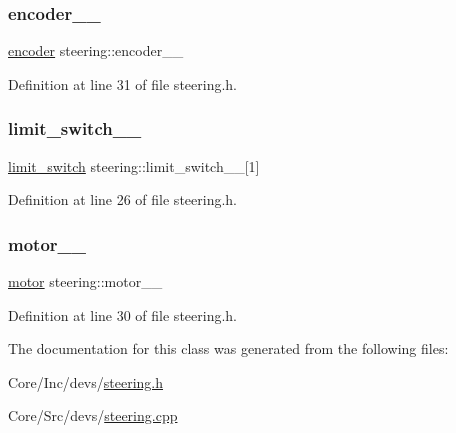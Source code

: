 \subsubsection{\texorpdfstring{encoder\_\_}{encoder\_\_}}
{\footnotesize\ttfamily \mbox{\hyperlink{classencoder}{encoder}} steering\+::encoder\+\_\+\+\_\+\hspace{0.3cm}{\ttfamily [private]}}



Definition at line 31 of file steering.\+h.

\mbox{\label{classsteering_a8f20b7cbd6755817c0ac42370d91d173}} 
\subsubsection{\texorpdfstring{limit\_switch\_\_}{limit\_switch\_\_}}
{\footnotesize\ttfamily \mbox{\hyperlink{structlimit__switch}{limit\+\_\+switch}} steering\+::limit\+\_\+switch\+\_\+\+\_\+\mbox{[}1\mbox{]}}



Definition at line 26 of file steering.\+h.

\mbox{\label{classsteering_ae6f1468c34059bfeecec645f6a51971a}} 
\subsubsection{\texorpdfstring{motor\_\_}{motor\_\_}}
{\footnotesize\ttfamily \mbox{\hyperlink{classmotor}{motor}} steering\+::motor\+\_\+\+\_\+\hspace{0.3cm}{\ttfamily [private]}}



Definition at line 30 of file steering.\+h.



The documentation for this class was generated from the following files\+:\begin{DoxyCompactItemize}
\item 
Core/\+Inc/devs/\mbox{\hyperlink{steering_8h}{steering.\+h}}\item 
Core/\+Src/devs/\mbox{\hyperlink{steering_8cpp}{steering.\+cpp}}\end{DoxyCompactItemize}
